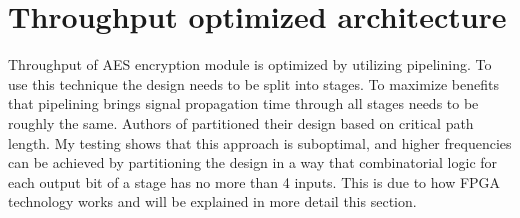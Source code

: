 \section{Throughput optimized architecture}
\label{sec:throughput-optimized-architecture}

Throughput of AES encryption module is optimized by utilizing pipelining. To use this technique the design needs to be split into stages. To maximize benefits that pipelining brings signal propagation time through all stages needs to be roughly the same. Authors of \cite{vlsi} partitioned their design based on critical path length. My testing shows that this approach is suboptimal, and higher frequencies can be achieved by partitioning the design in a way that combinatorial logic for each output bit of a stage has no more than 4 inputs. This is due to how FPGA technology works and will be explained in more detail this section.

% 
% 
% 
% 
% 
% 
% 
% 
% 
% 
% 

